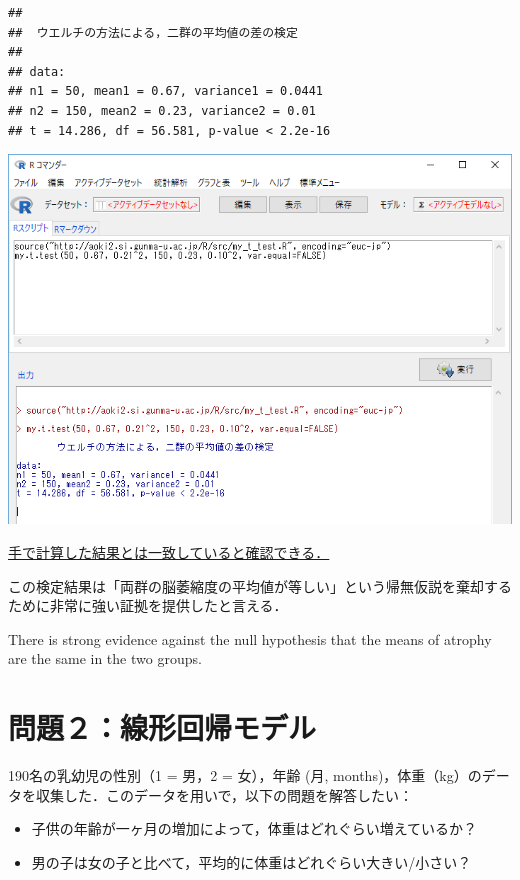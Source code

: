 \documentclass[11pt,]{problemset}
\begin{document}
\begin{verbatim}
## 
##  ウエルチの方法による，二群の平均値の差の検定
## 
## data:  
## n1 = 50, mean1 = 0.67, variance1 = 0.0441
## n2 = 150, mean2 = 0.23, variance2 = 0.01
## t = 14.286, df = 56.581, p-value < 2.2e-16
\end{verbatim}

\begin{center}\includegraphics[width=0.9\linewidth]{pic/myttest02} \end{center}
\bigskip

\underline{手で計算した結果とは一致していると確認できる．}

この検定結果は「両群の脳萎縮度の平均値が等しい」という帰無仮説を棄却するために非常に強い証拠を提供したと言える．

There is strong evidence against the null hypothesis that the means of
atrophy are the same in the two groups.

\newpage
\vfill

\section{問題２：線形回帰モデル}

190名の乳幼児の性別（1 = 男，2 = 女），年齢 (月,
months)，体重（kg）のデータを収集した．このデータを用いで，以下の問題を解答したい：

\begin{itemize}
\item
  子供の年齢が一ヶ月の増加によって，体重はどれぐらい増えているか？
\item
  男の子は女の子と比べて，平均的に体重はどれぐらい大きい/小さい？
\end{itemize}
\end{document}
